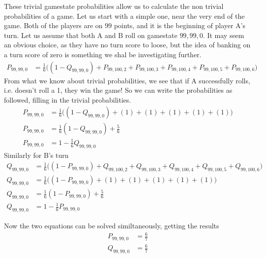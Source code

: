 \documentclass[a4paper,titlepage]{article}
\begin{document}
These trivial gamestate probabilities allow us to calculate the non trivial probabilities of a game.
Let us start with a simple one, near the very end of the game. Both of the players are on $99$ points, and it is the beginning of player A's turn.
Let us assume that both A and B roll on gamestate $99,99,0$.
It may seem an obvious choice, as they have no turn score to loose, but the idea of banking on a turn score of zero is something we shal be investigating further.
\begin{align*}
	P_{99,99,0} &= \frac{1}{6}\bigg((1 - Q_{99,99,0}) + P_{99,100,2} + P_{99,100,3} + P_{99,100,4} + P_{99,100,5} + P_{99,100,6}\bigg)
\end{align*}
From what we know about trivial probabilities, we see that if A successfully rolls, i.e. doesn't roll a 1, they win the game!
So we can write the probabilities as followed, filling in the trivial probabilities.
\begin{align*}
	P_{99,99,0} &= \frac{1}{6}\bigg((1 - Q_{99,99,0}) + (1) + (1) + (1) + (1) + (1)\bigg)\\
	P_{99,99,0} &= \frac{1}{6}(1 - Q_{99,99,0})+\frac{5}{6}\\
	P_{99,99,0} &= 1 - \frac{1}{6}Q_{99,99,0}
\end{align*}
Similarly for B's turn
\begin{align*}
	Q_{99,99,0} &= \frac{1}{6}\bigg((1 - P_{99,99,0}) + Q_{99,100,2} + Q_{99,100,3} + Q_{99,100,4} + Q_{99,100,5} + Q_{99,100,6}\bigg)\\
	Q_{99,99,0} &= \frac{1}{6}\bigg((1 - P_{99,99,0}) + (1) + (1) + (1) + (1) + (1)\bigg)\\
	Q_{99,99,0} &= \frac{1}{6}(1 - P_{99,99,0})+\frac{5}{6}\\
	Q_{99,99,0} &= 1 - \frac{1}{6}P_{99,99,0}
\end{align*}

Now the two equations can be solved similtaneously, getting the results
\begin{align*}
	P_{99,99,0} &= \frac{6}{7}\\
	Q_{99,99,0} &= \frac{6}{7}
\end{align*}
\end{document}
